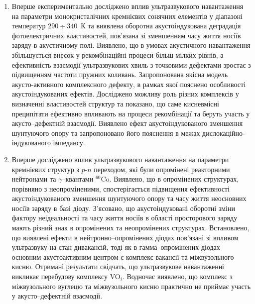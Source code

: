\begin{enumerate}
  \item Вперше експериментально досліджено вплив ультразвукового навантаження на параметри монокристалічних кремнієвих сонячних елементів у діапазоні температур $290\div340$~К
  та виявлена оборотна акустоіндукована деградація фотоелектричних властивостей, пов'язана зі зменшенням часу життя носіїв заряду в акустичному полі.
  Виявлено, що в умовах акустичного навантаження збільшується внесок у рекомбінаційні процеси більш мілких рівнів, а ефективність взаємодії ультразвукових хвиль з точковими дефектами зростає з підвищенням частоти пружних коливань.
  Запропонована якісна модель акусто-активного комплексного дефекту, в рамках якої пояснено особливості акустоіндукованих ефектів.
  Досліджено можливу роль різних комплексів у визначенні властивостей структур та показано, що саме кисневмісні преципітати ефективно впливають на процеси рекомбінації та беруть участь у акусто--дефектній взаємодії.
 Виявлено ефект акустоіндукованого зменшення шунтуючого опору та запропоновано його пояснення в межах дислокаційно-індукованого імпедансу.

\item Вперше досліджено вплив ультразвукового навантаження на параметри кремнієвих структур з $p$-$n$ переходом, які були опромінені реакторними нейтронами та $\gamma$--квантами $^{60}$Co.
      Виявлено, що в опромінених структурах, порівняно з неопроміненими, спостерігається підвищення ефективності акустоіндукованого зменшення шунтуючого опору та часу життя неосновних носіїв заряду в базі діоду.
      З'ясовано, що акустоіндуковані оборотні зміни фактору неідеальності та часу життя носіїв в області просторового заряду   мають різний знак в опромінених та неопромінених структурах.
      Встановлено, що виявлені ефекти в нейтронно--опромінених діодах пов'язані зі впливом ультразвуку на стан дивакансій,  тоді як в гамма--опромінених діодах основним акустоактивним центром є комплекс вакансії та міжвузольного кисню.
     Отримані результати свідчать, що ультразвукове навантаженні викликає перебудову комплексу VO$_i$.
     Водночас виявлено, що комплекс з міжвузольного вуглецю та міжвузольного кисню практично не приймає участь у акусто--дефектній взаємодії.


\end{enumerate}
